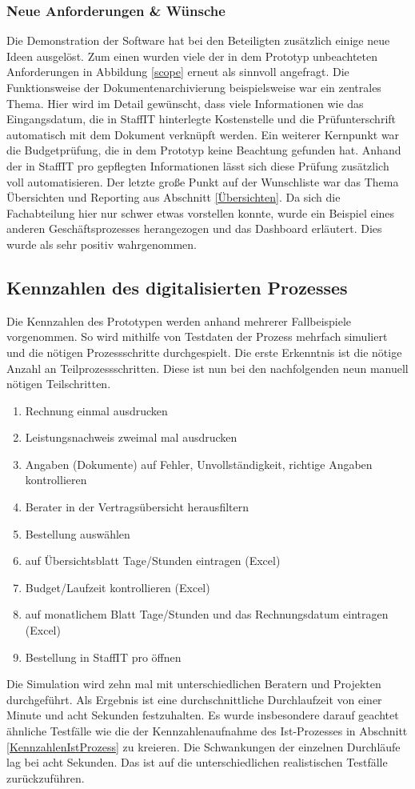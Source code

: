 \subsubsection{Neue Anforderungen \& Wünsche}
Die Demonstration der Software hat bei den Beteiligten zusätzlich einige neue Ideen ausgelöst. Zum einen wurden viele der in dem Prototyp unbeachteten Anforderungen in Abbildung \ref{scope} erneut als sinnvoll angefragt. Die Funktionsweise der Dokumentenarchivierung beispielsweise war ein zentrales Thema. Hier wird im Detail gewünscht, dass viele Informationen wie das Eingangsdatum, die in StaffIT hinterlegte Kostenstelle und die Prüfunterschrift automatisch mit dem Dokument verknüpft werden. Ein weiterer Kernpunkt war die Budgetprüfung, die in dem Prototyp keine Beachtung gefunden hat. Anhand der in \glqq StaffIT pro\grqq{} gepflegten Informationen lässt sich diese Prüfung zusätzlich voll automatisieren. Der letzte große Punkt auf der Wunschliste war das Thema Übersichten und Reporting aus Abschnitt \ref{Übersichten}. Da sich die Fachabteilung hier nur schwer etwas vorstellen konnte, wurde ein Beispiel eines anderen Geschäftsprozesses herangezogen und das Dashboard erläutert. Dies wurde als sehr positiv wahrgenommen. 
\subsection{Kennzahlen des digitalisierten Prozesses}\label{KennzahlenSollProzess}
Die Kennzahlen des Prototypen werden anhand mehrerer Fallbeispiele vorgenommen. So wird mithilfe von Testdaten der Prozess mehrfach simuliert und die nötigen Prozessschritte durchgespielt. Die erste Erkenntnis ist die nötige Anzahl an Teilprozessschritten. Diese ist nun bei den nachfolgenden neun manuell nötigen Teilschritten.
\begin{enumerate}
	\item Rechnung einmal ausdrucken
	\item Leistungsnachweis zweimal mal ausdrucken 
	\item Angaben (Dokumente) auf Fehler, Unvollständigkeit, richtige Angaben kontrollieren
	\item Berater in der Vertragsübersicht herausfiltern
	\item Bestellung auswählen
	\item auf Übersichtsblatt Tage/Stunden eintragen (Excel)
	\item Budget/Laufzeit kontrollieren (Excel)
	\item auf monatlichem Blatt Tage/Stunden und das Rechnungsdatum eintragen (Excel)
	\item Bestellung in \grqq StaffIT pro\grqq{} öffnen
\end{enumerate}
Die Simulation wird zehn mal mit unterschiedlichen Beratern und Projekten durchgeführt. Als Ergebnis ist eine durchschnittliche Durchlaufzeit von einer Minute und acht Sekunden festzuhalten. Es wurde insbesondere darauf geachtet ähnliche Testfälle wie die der Kennzahlenaufnahme des Ist-Prozesses in Abschnitt \ref{KennzahlenIstProzess} zu kreieren. Die Schwankungen der einzelnen Durchläufe lag bei acht Sekunden. Das ist auf die unterschiedlichen realistischen Testfälle zurückzuführen. 

